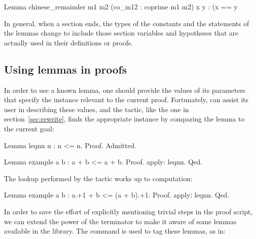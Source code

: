 \begin{coq}{}{}
Lemma chinese_remainder m1 m2 (co_m12 : coprime m1 m2) x y :
  (x == y %
\end{coq}

In general, when a section ends, the types of the constants and the
statements of the lemmas change to include those section variables
and hypotheses that are actually used in their definitions or proofs.
% 
% 
% 
% 
% 
% 



\subsection{Using lemmas in proofs}
\label{sec:quantifiedst}

In order to use a known lemma, one should provide the values of its
parameters that specify the instance relevant to the current
proof. Fortunately, \Coq{} can assist its user in
describing these values, and the  tactic, like the
 one in section~\ref{sec:rewrite}, finds the appropriate
instance by comparing the lemma to the current goal:

\begin{coq}{}{}
Lemma leqnn n : n <= n. Proof. Admitted.

Lemma example a b : a + b <= a + b.
Proof. apply: leqnn. Qed.
\end{coq}
The lookup performed by the  tactic works up to computation:

\begin{coq}{}{}
Lemma example a b : a.+1 + b <= (a + b).+1.
Proof. apply: leqnn. Qed.
\end{coq}
In order to save the effort of explicitly mentioning trivial
steps in the proof script, we can extend the power of the 
terminator to make it aware of some lemmas available in
the library. The  command is used to tag these lemmas,
as in:


